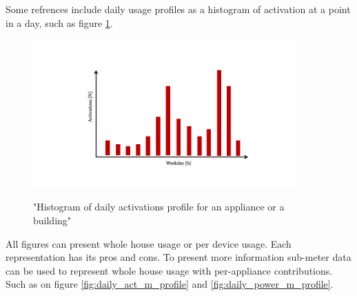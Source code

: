 Some refrences include daily usage profiles as a histogram of activation at a point in a day, such as figure \ref{fig:daily_act_profile}.

\begin{figure}[H]
	\centering
	\caption{"Histogram of daily activations profile for an appliance or a building"}
	\includegraphics[width=0.9\textwidth]{Figures/profile_sketches/Slide5.png}
	\label{fig:daily_act_profile}
\end{figure}

All figures can present whole house usage or per device usage. Each representation has its pros and cons. 
To present more information sub-meter data can be used to represent whole house usage with per-appliance contributions.
Such as on figure \ref{fig:daily_act_m_profile} and \ref{fig:daily_power_m_profile}.

